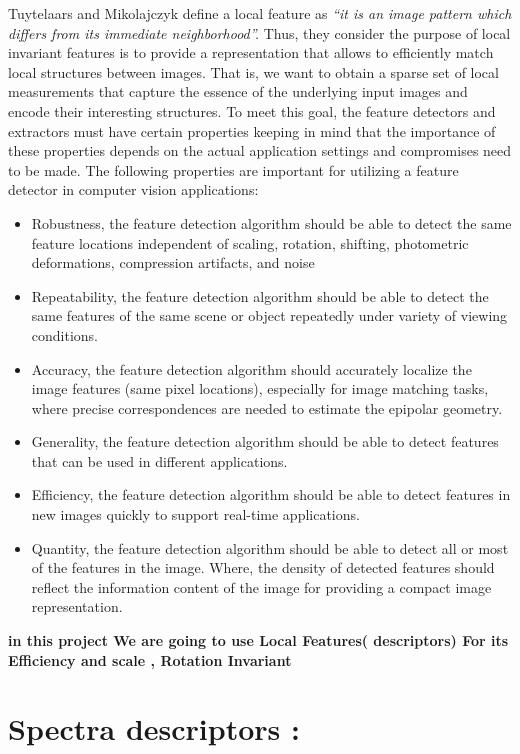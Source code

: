 Tuytelaars and Mikolajczyk \cite{MM} define a local feature as \textit{ “it is an image pattern
which differs from its immediate neighborhood”.} Thus, they consider the purpose of
local invariant features is to provide a representation that allows to efficiently match
local structures between images. That is, we want to obtain a sparse set of local
measurements that capture the essence of the underlying input images and encode
their interesting structures. To meet this goal, the feature detectors and extractors
must have certain properties keeping in mind that the importance of these properties
depends on the actual application settings and compromises need to be made. The
following properties are important for utilizing a feature detector in computer vision
applications:
\begin{itemize}
\item Robustness, the feature detection algorithm should be able to detect the same feature
locations independent of scaling, rotation, shifting, photometric deformations,
compression artifacts, and noise
\item Repeatability, the feature detection algorithm should be able to detect the same
features of the same scene or object repeatedly under variety of viewing conditions.
\item Accuracy, the feature detection algorithm should accurately localize the image
features (same pixel locations), especially for image matching tasks, where precise
correspondences are needed to estimate the epipolar geometry.
\item Generality, the feature detection algorithm should be able to detect features that
can be used in different applications.
\item Efficiency, the feature detection algorithm should be able to detect features in new
images quickly to support real-time applications.
\item Quantity, the feature detection algorithm should be able to detect all or most of the
features in the image. Where, the density of detected features should reflect the
information content of the image for providing a compact image representation.
\end{itemize}

\textbf{in this project We are going to use Local Features( descriptors) For its Efficiency and scale , Rotation  Invariant }\\
\section{Spectra descriptors :}
